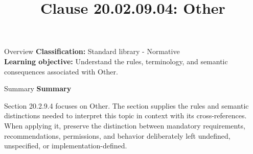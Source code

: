 \documentclass[10pt,letterpaper]{article}
\title{Clause 20.02.09.04: Other}
\author{}
\date{}
\begin{document}
\maketitle
\begin{CornellOverviewBox}{Overview}
\textbf{Classification:} Standard library - Normative\\[2pt]
\textbf{Learning objective:} Understand the rules, terminology, and semantic consequences associated with Other.
\end{CornellOverviewBox}\begin{CornellSummaryBox}{Summary}
{\sffamily\bfseries\color{Accent} Summary}\par\vspace{3pt}Section 20.2.9.4 focuses on Other. The section supplies the rules and semantic distinctions needed to interpret this topic in context with its cross-references. When applying it, preserve the distinction between mandatory requirements, recommendations, permissions, and behavior deliberately left undefined, unspecified, or implementation-defined.
\end{CornellSummaryBox}
\end{document}
